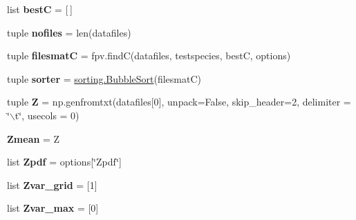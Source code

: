 \begin{DoxyCompactItemize}
\item 
\hypertarget{namespacechemtable__io_af63e8f6f0192a989c612d87284afffa1}{
list {\bfseries bestC} = \mbox{[}$\,$\mbox{]}}
\label{dc/dad/namespacechemtable__io_af63e8f6f0192a989c612d87284afffa1}

\item 
\hypertarget{namespacechemtable__io_a3215db09f5c5375c0cf4217d1fc60018}{
tuple {\bfseries nofiles} = len(datafiles)}
\label{dc/dad/namespacechemtable__io_a3215db09f5c5375c0cf4217d1fc60018}

\item 
\hypertarget{namespacechemtable__io_ab4d4f8b2606406aee953c949c733ff23}{
tuple {\bfseries filesmatC} = fpv.findC(datafiles, testspecies, bestC, options)}
\label{dc/dad/namespacechemtable__io_ab4d4f8b2606406aee953c949c733ff23}

\item 
\hypertarget{namespacechemtable__io_a134a8ef10c96afb595621e53edc37a46}{
tuple {\bfseries sorter} = \hyperlink{classsorting_1_1BubbleSort}{sorting.BubbleSort}(filesmatC)}
\label{dc/dad/namespacechemtable__io_a134a8ef10c96afb595621e53edc37a46}

\item 
\hypertarget{namespacechemtable__io_ad6c61ec8edbd2fb268dea3beeccf73b3}{
tuple {\bfseries Z} = np.genfromtxt(datafiles\mbox{[}0\mbox{]}, unpack=False, skip\_\-header=2, delimiter = \char`\"{}$\backslash$t\char`\"{}, usecols = 0)}
\label{dc/dad/namespacechemtable__io_ad6c61ec8edbd2fb268dea3beeccf73b3}

\item 
\hypertarget{namespacechemtable__io_aa3a55a311e9923d278d9900a1e0375fb}{
{\bfseries Zmean} = Z}
\label{dc/dad/namespacechemtable__io_aa3a55a311e9923d278d9900a1e0375fb}

\item 
\hypertarget{namespacechemtable__io_ab1ad0cbbab901d493909ee312a088775}{
list {\bfseries Zpdf} = options\mbox{[}\char`\"{}Zpdf\char`\"{}\mbox{]}}
\label{dc/dad/namespacechemtable__io_ab1ad0cbbab901d493909ee312a088775}

\item 
\hypertarget{namespacechemtable__io_a57dc94c99e2353aa2176d3171b482007}{
list {\bfseries Zvar\_\-grid} = \mbox{[}1\mbox{]}}
\label{dc/dad/namespacechemtable__io_a57dc94c99e2353aa2176d3171b482007}

\item 
\hypertarget{namespacechemtable__io_a4a17b346df8f018f30b94d7b33e3ee04}{
list {\bfseries Zvar\_\-max} = \mbox{[}0\mbox{]}}
\label{dc/dad/namespacechemtable__io_a4a17b346df8f018f30b94d7b33e3ee04}


\end{DoxyCompactItemize}
